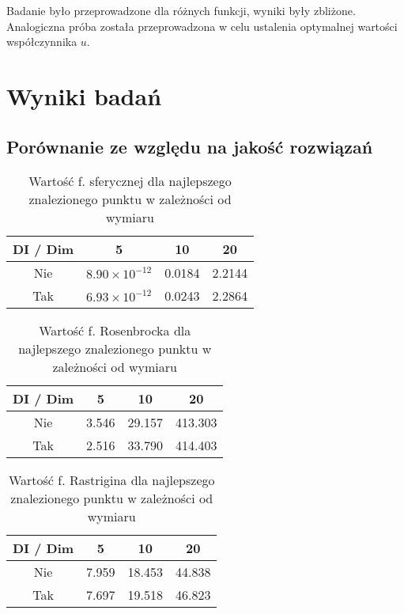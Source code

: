 \documentclass[12pt]{article}
\begin{document}
Badanie było przeprowadzone dla różnych funkcji, wyniki były zbliżone.
Analogiczna próba została przeprowadzona w celu ustalenia optymalnej wartości współczynnika $u$.


\pagebreak
\section{Wyniki badań}
\subsection*{Porównanie ze względu na jakość rozwiązań}

\begin{table}[h!]
	\centering
	\begin{tabular}{|c|c|c|c|}
		\hline
		DI  / Dim & 5                      & 10     & 20     \\
		\hline
		Nie       & $8.90 \times 10^{-12}$ & 0.0184 & 2.2144 \\
		Tak       & $6.93 \times 10^{-12}$ & 0.0243 & 2.2864 \\
		\hline
	\end{tabular}
	\caption{Wartość f. sferycznej dla najlepszego znalezionego punktu w zależności od wymiaru}
	\label{tab:sphere_values}
\end{table}

\begin{table}[h!]
	\centering
	\begin{tabular}{|c|c|c|c|}
		\hline
		DI / Dim & 5     & 10     & 20      \\
		\hline
		Nie      & 3.546 & 29.157 & 413.303 \\
		Tak      & 2.516 & 33.790 & 414.403 \\
		\hline
	\end{tabular}
	\caption{Wartość f. Rosenbrocka dla najlepszego znalezionego punktu w zależności od wymiaru}
	\label{tab:rosenbrock_values}
\end{table}

\begin{table}[h!]
	\centering
	\begin{tabular}{|c|c|c|c|}
		\hline
		DI / Dim & 5     & 10     & 20     \\
		\hline
		Nie      & 7.959 & 18.453 & 44.838 \\
		Tak      & 7.697 & 19.518 & 46.823 \\
		\hline
	\end{tabular}
	\caption{Wartość f. Rastrigina dla najlepszego znalezionego punktu w zależności od wymiaru}
	\label{tab:rastrigin_values}
\end{table}
\end{document}
